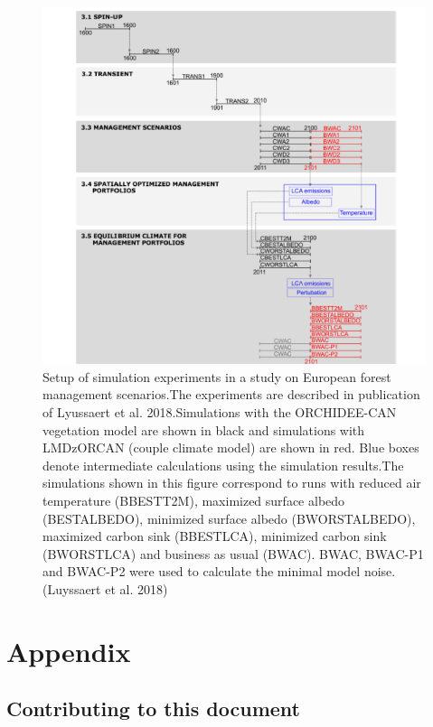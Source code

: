 \documentclass[12pt,oneside]{book}
\begin{document}
\begin{figure}

{\centering \includegraphics[width=0.8\linewidth]{figures/chap10/f10_15_luyssaert} 

}

\caption{ Setup of simulation experiments in a study on European forest management scenarios.The experiments are described in publication of Lyussaert et al. 2018.Simulations with the ORCHIDEE-CAN vegetation model are shown in black and simulations with LMDzORCAN (couple climate model) are shown in red. Blue boxes denote intermediate calculations using the simulation results.The simulations shown in this figure correspond to runs with reduced air temperature (BBESTT2M), maximized surface albedo (BESTALBEDO), minimized surface albedo (BWORSTALBEDO), maximized carbon sink (BBESTLCA), minimized carbon sink (BWORSTLCA) and business as usual (BWAC). BWAC, BWAC-P1 and BWAC-P2 were used to calculate the minimal model noise. (Luyssaert et al. 2018)}\label{fig:f1015}
\end{figure}

\part{Appendix}\label{part-appendix}

\chapter*{Contributing to this
document}\label{contributing-to-this-document}
\end{document}
